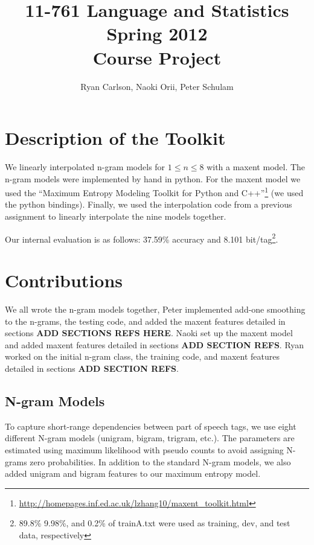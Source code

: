 \documentclass[11pt]{article}
\begin{document}
 

\title{{11-761 Language and Statistics\\Spring 2012\\Course Project}}
\author{Ryan Carlson, Naoki Orii, Peter Schulam}
\maketitle

\section{Description of the Toolkit}

We linearly interpolated n-gram models for $1 \le n \le 8$ with a maxent model. The n-gram models were implemented by hand in python. For the maxent model we used the ``Maximum Entropy Modeling Toolkit for Python and C++''\footnote{\url{http://homepages.inf.ed.ac.uk/lzhang10/maxent_toolkit.html}} (we used the python bindings). Finally, we used the interpolation code from a previous assignment to linearly interpolate the nine models together.

Our internal evaluation is as follows: 37.59\% accuracy and 8.101 bit/tag\footnote{89.8\%  9.98\%, and 0.2\% of trainA.txt were used as training, dev, and test data, respectively}.

\section{Contributions}

We all wrote the n-gram models together, Peter implemented add-one smoothing to the n-grams, the testing code, and added the maxent features detailed in sections \textbf{ADD SECTIONS REFS HERE}. Naoki set up the maxent model and added maxent features detailed in sections \textbf{ADD SECTION REFS}. Ryan worked on the initial n-gram class, the training code, and maxent features detailed in sections \textbf{ADD SECTION REFS}.

\subsection{N-gram Models}

To capture short-range dependencies between part of speech tags, we use
eight different N-gram models (unigram, bigram, trigram, etc.). The
parameters are estimated using maximum likelihood with pseudo counts to
avoid assigning N-grams zero probabilities. In addition to the standard
N-gram models, we also added unigram and bigram features to our maximum
entropy model. 
\end{document}
